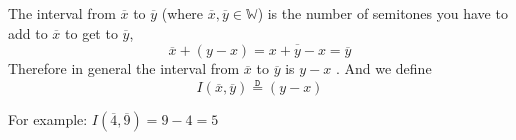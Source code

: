 \documentclass[preview]{standalone}
\begin{document}
\begin{center}
The interval from  $ \overline{x}$ to $ \overline{y }$ (where $ \overline{x}, \overline{y} \in \mathbb{W}$) is the number of semitones you have to add to $ \overline{x}$ to get to $ \overline{y}$, 
  \[
	\overline{x}  +  \left( y  -  x \right) = \overline{x  +  y  -  x} = \overline{y}
  \]
  Therefore in general the interval from $ \overline{x}$  to $ \overline{y}$ is $y  - x$ . And we define 
  \[
	I\left( \overline{x}, \overline{y}\right) \stackrel{\mathtt{D}}{=} (y  -  x) 
  \]

  For example: $I\left( \overline{4}, \overline{9}\right) = 9  -  4 = 5$
\end{center}
\end{document}
